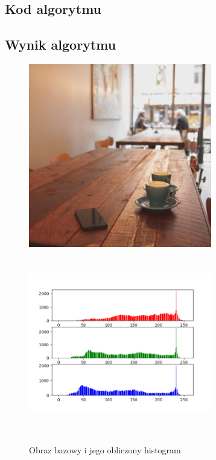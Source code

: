 \documentclass[a4paper,12pt]{book}
\begin{document}
\subsection*{Kod algorytmu}

\subsection*{Wynik algorytmu}
\begin{figure}[H]
	\caption{Obraz bazowy i jego obliczony histogram}
	\includegraphics[width=8cm, height=8cm]{coffee-unmodified.jpg}
	\includegraphics[width=8cm, height=8cm]{6-1/calculate-coffee.png}
\end{figure}
\end{document}
